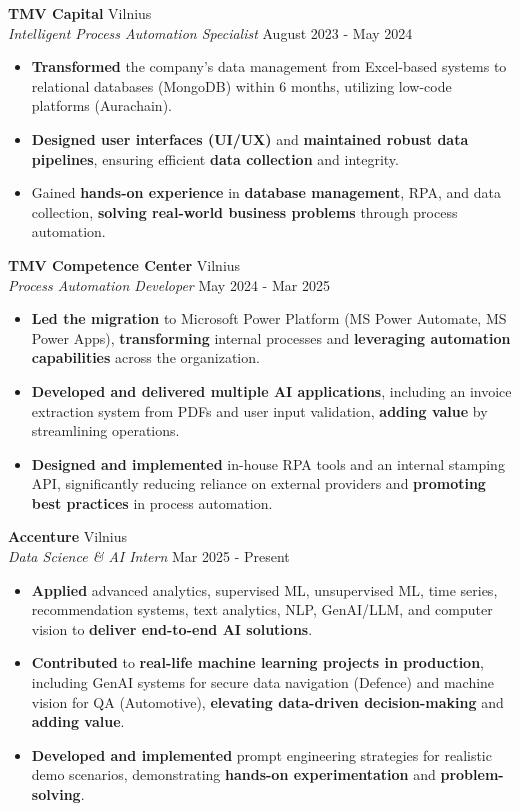 \documentclass[a4paper]{article}
\begin{document}
\textbf{TMV Capital} \hfill Vilnius\\
\textit{Intelligent Process Automation Specialist} \hfill August 2023 - May 2024\\
\vspace{-1mm}
\begin{itemize} \itemsep 1pt
	\item \textbf{Transformed} the company's data management from Excel-based systems to relational databases (MongoDB) within 6 months, utilizing low-code platforms (Aurachain).
	\item \textbf{Designed user interfaces (UI/UX)} and \textbf{maintained robust data pipelines}, ensuring efficient \textbf{data collection} and integrity.
	\item Gained \textbf{hands-on experience} in \textbf{database management}, RPA, and data collection, \textbf{solving real-world business problems} through process automation.
\end{itemize}
\textbf{TMV Competence Center} \hfill Vilnius\\
\textit{Process Automation Developer} \hfill May 2024 - Mar 2025\\
\vspace{-1mm}
\begin{itemize} \itemsep 1pt
	\item \textbf{Led the migration} to Microsoft Power Platform (MS Power Automate, MS Power Apps), \textbf{transforming} internal processes and \textbf{leveraging automation capabilities} across the organization.
	\item \textbf{Developed and delivered multiple AI applications}, including an invoice extraction system from PDFs and user input validation, \textbf{adding value} by streamlining operations.
	\item \textbf{Designed and implemented} in-house RPA tools and an internal stamping API, significantly reducing reliance on external providers and \textbf{promoting best practices} in process automation.
\end{itemize}
\textbf{Accenture} \hfill Vilnius\\
\textit{Data Science \& AI Intern} \hfill Mar 2025 - Present\\
\vspace{-1mm}
\begin{itemize} \itemsep 1pt
	\item \textbf{Applied} advanced analytics, supervised ML, unsupervised ML, time series, recommendation systems, text analytics, NLP, GenAI/LLM, and computer vision to \textbf{deliver end-to-end AI solutions}.
	\item \textbf{Contributed} to \textbf{real-life machine learning projects in production}, including GenAI systems for secure data navigation (Defence) and machine vision for QA (Automotive), \textbf{elevating data-driven decision-making} and \textbf{adding value}.
	\item \textbf{Developed and implemented} prompt engineering strategies for realistic demo scenarios, demonstrating \textbf{hands-on experimentation} and \textbf{problem-solving}.
\end{itemize}
\end{document}
